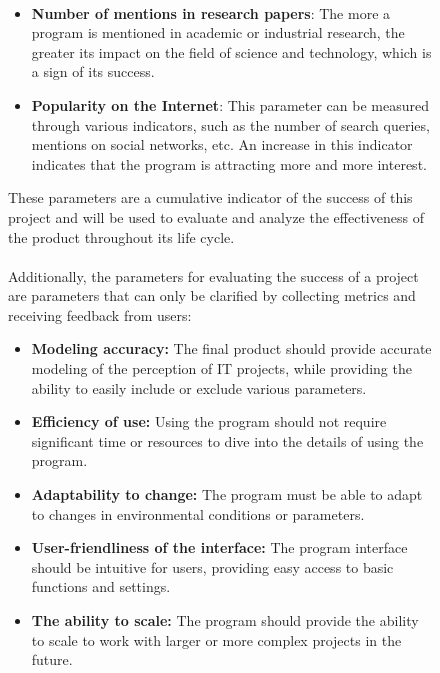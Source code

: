 \documentclass{article}
\begin{document}
\begin{figure}[!t]
\begin{minipage}{0.49\textwidth}
        ~\\
        ~\\
        ~\\
        ~\\
        ~\\
        ~\\
        \end{minipage}
        \hfill
        \begin{minipage}{0.49\textwidth}
            \begin{itemize}
                \item \textbf{Number of mentions in research papers}: The more a program is mentioned in academic or industrial research, the greater its impact on the field of science and technology, which is a sign of its success.
                \item \textbf{Popularity on the Internet}: This parameter can be measured through various indicators, such as the number of search queries, mentions on social networks, etc. An increase in this indicator indicates that the program is attracting more and more interest.
            \end{itemize}
            These parameters are a cumulative indicator of the success of this project and will be used to evaluate and analyze the effectiveness of the product throughout its life cycle.\\
            ~\\
            Additionally, the parameters for evaluating the success of a project are parameters that can only be clarified by collecting metrics and receiving feedback from users:
            \begin{itemize}
                \item \textbf{Modeling accuracy:} The final product should provide accurate modeling of the perception of IT projects, while providing the ability to easily include or exclude various parameters.
                \item \textbf{Efficiency of use:} Using the program should not require significant time or resources to dive into the details of using the program.
                \item \textbf{Adaptability to change:} The program must be able to adapt to changes in environmental conditions or parameters.
                \item \textbf{User-friendliness of the interface:} The program interface should be intuitive for users, providing easy access to basic functions and settings.
                \item \textbf{The ability to scale:} The program should provide the ability to scale to work with larger or more complex projects in the future.
            \end{itemize}
            \begin{center}

\end{center}
\end{minipage}
\end{figure}
\end{document}
